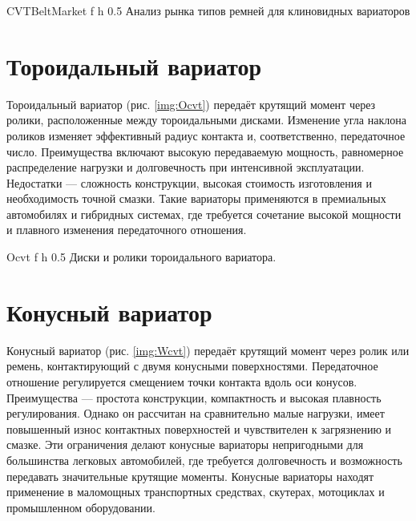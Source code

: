     {CVTBeltMarket} %
    {f} %
    {h} %
    {0.5\textwidth} %
    {Анализ рынка типов ремней для клиновидных вариаторов \cite{CVTBeltMarketLib}} %

\section{Тороидальный вариатор}

Тороидальный вариатор (рис. \ref{img:Ocvt}) передаёт крутящий момент через ролики, расположенные между тороидальными дисками. Изменение угла наклона роликов изменяет эффективный радиус контакта и, соответственно, передаточное число. Преимущества включают высокую передаваемую мощность, равномерное распределение нагрузки и долговечность при интенсивной эксплуатации. Недостатки — сложность конструкции, высокая стоимость изготовления и необходимость точной смазки. Такие вариаторы применяются в премиальных автомобилях и гибридных системах, где требуется сочетание высокой мощности и плавного изменения передаточного отношения.

    {Ocvt} %
    {f} %
    {h} %
    {0.5\textwidth} %
    {Диски и ролики тороидального вариатора.} %

\section{Конусный вариатор}

Конусный вариатор (рис. \ref{img:Wcvt}) передаёт крутящий момент через ролик или ремень, контактирующий с двумя конусными поверхностями. Передаточное отношение регулируется смещением точки контакта вдоль оси конусов. Преимущества — простота конструкции, компактность и высокая плавность регулирования. Однако он рассчитан на сравнительно малые нагрузки, имеет повышенный износ контактных поверхностей и чувствителен к загрязнению и смазке. Эти ограничения делают конусные вариаторы непригодными для большинства легковых автомобилей, где требуется долговечность и возможность передавать значительные крутящие моменты. Конусные вариаторы находят применение в маломощных транспортных средствах, скутерах, мотоциклах и промышленном оборудовании.

